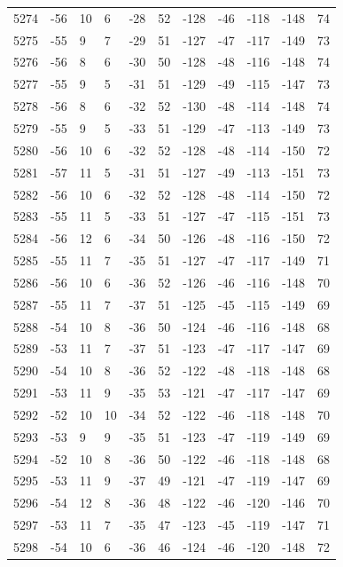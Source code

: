\begin{table}[H]
\begin{tabular}{lllllllllll}
5274 & -56 & 10 & 6 & -28 & 52 & -128 & -46 & -118 & -148 & 74 \\
5275 & -55 & 9 & 7 & -29 & 51 & -127 & -47 & -117 & -149 & 73 \\
5276 & -56 & 8 & 6 & -30 & 50 & -128 & -48 & -116 & -148 & 74 \\
5277 & -55 & 9 & 5 & -31 & 51 & -129 & -49 & -115 & -147 & 73 \\
5278 & -56 & 8 & 6 & -32 & 52 & -130 & -48 & -114 & -148 & 74 \\
5279 & -55 & 9 & 5 & -33 & 51 & -129 & -47 & -113 & -149 & 73 \\
5280 & -56 & 10 & 6 & -32 & 52 & -128 & -48 & -114 & -150 & 72 \\
5281 & -57 & 11 & 5 & -31 & 51 & -127 & -49 & -113 & -151 & 73 \\
5282 & -56 & 10 & 6 & -32 & 52 & -128 & -48 & -114 & -150 & 72 \\
5283 & -55 & 11 & 5 & -33 & 51 & -127 & -47 & -115 & -151 & 73 \\
5284 & -56 & 12 & 6 & -34 & 50 & -126 & -48 & -116 & -150 & 72 \\
5285 & -55 & 11 & 7 & -35 & 51 & -127 & -47 & -117 & -149 & 71 \\
5286 & -56 & 10 & 6 & -36 & 52 & -126 & -46 & -116 & -148 & 70 \\
5287 & -55 & 11 & 7 & -37 & 51 & -125 & -45 & -115 & -149 & 69 \\
5288 & -54 & 10 & 8 & -36 & 50 & -124 & -46 & -116 & -148 & 68 \\
5289 & -53 & 11 & 7 & -37 & 51 & -123 & -47 & -117 & -147 & 69 \\
5290 & -54 & 10 & 8 & -36 & 52 & -122 & -48 & -118 & -148 & 68 \\
5291 & -53 & 11 & 9 & -35 & 53 & -121 & -47 & -117 & -147 & 69 \\
5292 & -52 & 10 & 10 & -34 & 52 & -122 & -46 & -118 & -148 & 70 \\
5293 & -53 & 9 & 9 & -35 & 51 & -123 & -47 & -119 & -149 & 69 \\
5294 & -52 & 10 & 8 & -36 & 50 & -122 & -46 & -118 & -148 & 68 \\
5295 & -53 & 11 & 9 & -37 & 49 & -121 & -47 & -119 & -147 & 69 \\
5296 & -54 & 12 & 8 & -36 & 48 & -122 & -46 & -120 & -146 & 70 \\
5297 & -53 & 11 & 7 & -35 & 47 & -123 & -45 & -119 & -147 & 71 \\
5298 & -54 & 10 & 6 & -36 & 46 & -124 & -46 & -120 & -148 & 72 \\

\end{tabular}
\end{table}
